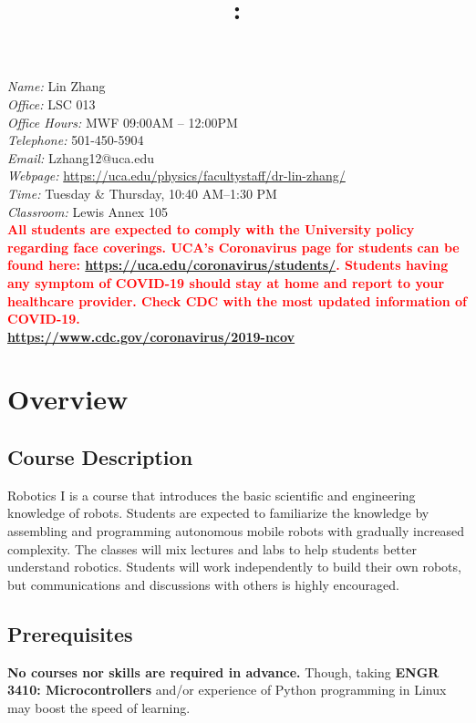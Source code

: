 \documentclass[11pt,letterpaper]{article}
\title{\Large\bfseries \coursecode: \coursetitle \\[0.1cm] \semester}
\author{}
\date{}
\makeatletter
\newcommand{\lefthead}[2]{\noindent{\large\textbf{#1}\hfill\\[#2]}}
\newcommand{\instructor}{Lin Zhang}
\newcommand{\office}{LSC 013}
\newcommand{\email}{Lzhang12@uca.edu}
\newcommand{\officehours}{MWF 09:00AM -- 12:00PM}
\newcommand{\classroom}{Lewis Annex 105}
\newcommand{\classtime}{Tuesday \& Thursday, 10:40 AM--1:30 PM}
\newcommand{\telephone}{501-450-5904}
\newcommand{\webpage}{\href{https://uca.edu/physics/facultystaff/dr-lin-zhang/}{https://uca.edu/physics/facultystaff/dr-lin-zhang/}}
\makeatother
\begin{document}
\maketitle
\thispagestyle{empty}
\vspace{-2cm}


\lefthead{Instructor}{0.3cm}
\indent \emph{Name:} \instructor \\
\indent \emph{Office:} \office \\
\indent \emph{Office Hours:} \officehours \\
\indent \emph{Telephone:} \telephone \\
\indent \emph{Email:} \email \\
\indent \emph{Webpage:} \webpage \\

\lefthead{Class \& Lab}{0.3cm}
\indent \emph{Time:} \classtime \\
\indent \emph{Classroom:} \classroom \\[0.3cm]


\noindent \textbf{\textcolor{red}{All students are expected to comply with the University policy regarding face coverings. UCA’s Coronavirus page for students can be found here: \href{https://uca.edu/coronavirus/students/}{https://uca.edu/coronavirus/students/}. Students having any symptom of COVID-19 should stay at home and report to your healthcare provider. Check CDC with the most updated information of COVID-19. \\\href{https://www.cdc.gov/coronavirus/2019-ncov}{https://www.cdc.gov/coronavirus/2019-ncov}}} 

\section*{Overview}
\subsection*{Course Description}
Robotics I is a course that introduces the basic scientific and engineering knowledge of robots. Students are expected to familiarize the knowledge by assembling and programming autonomous mobile robots with gradually increased complexity. The classes will mix lectures and labs to help students better understand robotics. Students will work independently to build their own robots, but communications and discussions with others is highly encouraged. 

\subsection*{Prerequisites}
\textbf{No courses nor skills are required in advance.} Though, taking \textbf{ENGR 3410: Microcontrollers} and/or experience of Python programming in Linux may boost the speed of learning. 
\end{document}
